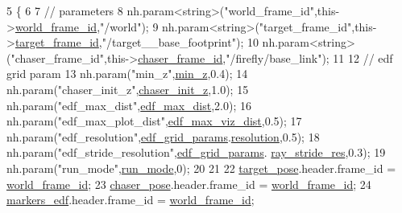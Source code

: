 \begin{DoxyCode}
5                                          \{
6 
7     \textcolor{comment}{// parameters}
8     nh.param<\textcolor{keywordtype}{string}>(\textcolor{stringliteral}{"world\_frame\_id"},this->\hyperlink{class_objects_handler_a1c0586ae7467bb8a3df8ad247ac7b10b}{world\_frame\_id},\textcolor{stringliteral}{"/world"});
9     nh.param<\textcolor{keywordtype}{string}>(\textcolor{stringliteral}{"target\_frame\_id"},this->\hyperlink{class_objects_handler_a7a616768386c4c7da9af4da3d07bd936}{target\_frame\_id},\textcolor{stringliteral}{"/target\_\_base\_footprint"});
10     nh.param<\textcolor{keywordtype}{string}>(\textcolor{stringliteral}{"chaser\_frame\_id"},this->\hyperlink{class_objects_handler_a3e8d08bf5d76d69f1768b53fd799953c}{chaser\_frame\_id},\textcolor{stringliteral}{"/firefly/base\_link"}); 
11 
12     \textcolor{comment}{// edf grid param}
13     nh.param(\textcolor{stringliteral}{"min\_z"},\hyperlink{class_objects_handler_ac8c10c7a10aeb8abf1a44b7361f646e6}{min\_z},0.4);   
14     nh.param(\textcolor{stringliteral}{"chaser\_init\_z"},\hyperlink{class_objects_handler_aa991434e17ca1144c80633ff7530534c}{chaser\_init\_z},1.0);             
15     nh.param(\textcolor{stringliteral}{"edf\_max\_dist"},\hyperlink{class_objects_handler_ae71885df3c4e28f45be7bb0e5a383293}{edf\_max\_dist},2.0);  
16     nh.param(\textcolor{stringliteral}{"edf\_max\_plot\_dist"},\hyperlink{class_objects_handler_a577e8b62f1e55d36330048fb9fd3a432}{edf\_max\_viz\_dist},0.5);  
17     nh.param(\textcolor{stringliteral}{"edf\_resolution"},\hyperlink{class_objects_handler_a46ed8cfd250b183909a7d3a1f56cee6b}{edf\_grid\_params}.\hyperlink{struct_field_params_a520406c76b3abf392401626bc2161370}{resolution},0.5);  
18     nh.param(\textcolor{stringliteral}{"edf\_stride\_resolution"},\hyperlink{class_objects_handler_a46ed8cfd250b183909a7d3a1f56cee6b}{edf\_grid\_params}.
      \hyperlink{struct_field_params_ae6eabaa6e593c9dbac48b2f96bea80ec}{ray\_stride\_res},0.3);  
19     nh.param(\textcolor{stringliteral}{"run\_mode"},\hyperlink{class_objects_handler_a95908d5b00f62b629dc7f20acb714292}{run\_mode},0);  
20 
21 
22     \hyperlink{class_objects_handler_ad436bfd8b262f473f0e4ca92b3c3402b}{target\_pose}.header.frame\_id = \hyperlink{class_objects_handler_a1c0586ae7467bb8a3df8ad247ac7b10b}{world\_frame\_id};
23     \hyperlink{class_objects_handler_a79fd5f872a40cca5ea599f1e83dcb3ad}{chaser\_pose}.header.frame\_id = \hyperlink{class_objects_handler_a1c0586ae7467bb8a3df8ad247ac7b10b}{world\_frame\_id};
24     \hyperlink{class_objects_handler_ad6904dcaaad790234569760df0fb0ac2}{markers\_edf}.header.frame\_id = \hyperlink{class_objects_handler_a1c0586ae7467bb8a3df8ad247ac7b10b}{world\_frame\_id};

\end{DoxyCode}
